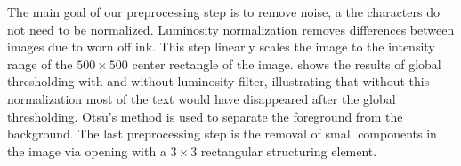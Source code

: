 The main goal of our preprocessing step is to remove noise, a the characters do not need to be normalized.
Luminosity normalization removes differences between images due to worn off ink. This step linearly scales the image to the intensity range of the $500 \times 500$ center rectangle of the image.  shows the results of global thresholding with and without luminosity filter, illustrating that  without this normalization most of the text would have disappeared after the global thresholding. 
Otsu's \cite{otsu1975threshold} method is used to separate the foreground from the background. 
The last preprocessing step is the removal of small components in the image via opening with a $3 \times 3$ rectangular structuring element.

